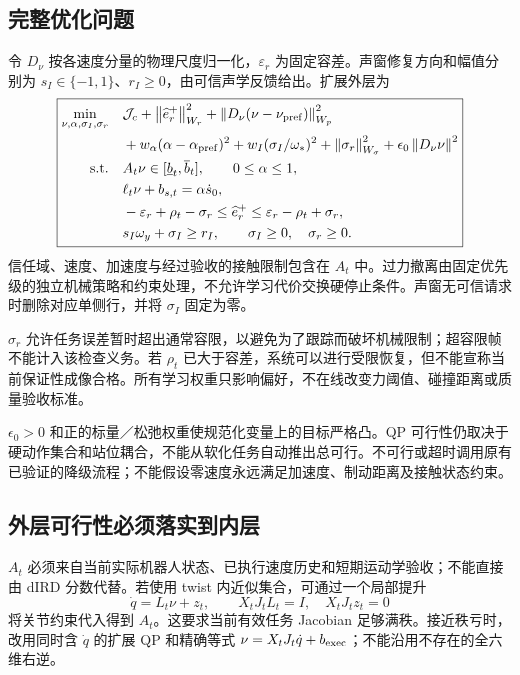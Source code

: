 \documentclass[UTF8,11pt,a4paper,fontset=fandol]{ctexart}
\numberwithin{equation}{section}
\theoremstyle{definition}
\newcommand{\norm}[1]{\left\lVert#1\right\rVert}
\begin{document}
\subsection{完整优化问题}
令 $D_\nu$ 按各速度分量的物理尺度归一化，$\varepsilon_r$ 为固定容差。声窗修复方向和幅值分别为 $s_I\in\{-1,1\}$、$r_I\ge0$，由可信声学反馈给出。扩展外层为
\begin{equation}
\boxed{
\begin{aligned}
\min_{\nu,\alpha,\sigma_I,\sigma_r}\quad &
\mathcal J_c
+\norm{\widehat e_r^+}_{W_r}^2
+\norm{D_\nu(\nu-\nu_{\rm pref})}_{W_p}^2\\
&+w_\alpha(\alpha-\alpha_{\rm pref})^2
+w_I(\sigma_I/\omega_*)^2+\norm{\sigma_r}_{W_\sigma}^2
+\epsilon_0\norm{D_\nu\nu}^2\\
\text{s.t.}\quad & A_t\nu\in[\underline b_t,\overline b_t],\qquad 0\le\alpha\le1,\\
&\ell_t\nu+b_{s,t}=\alpha\dot s_0,\\
&-\varepsilon_r+\rho_t-\sigma_r
\le\widehat e_r^+
\le\varepsilon_r-\rho_t+\sigma_r,\\
&s_I\omega_y+\sigma_I\ge r_I,\qquad
\sigma_I\ge0,\quad\sigma_r\ge0.
\end{aligned}}
\label{eq:fullqp}
\end{equation}
信任域、速度、加速度与经过验收的接触限制包含在 $A_t$ 中。过力撤离由固定优先级的独立机械策略和约束处理，不允许学习代价交换硬停止条件。声窗无可信请求时删除对应单侧行，并将 $\sigma_I$ 固定为零。

$\sigma_r$ 允许任务误差暂时超出通常容限，以避免为了跟踪而破坏机械限制；超容限帧不能计入该检查义务。若 $\rho_t$ 已大于容差，系统可以进行受限恢复，但不能宣称当前保证性成像合格。所有学习权重只影响偏好，不在线改变力阈值、碰撞距离或质量验收标准。

$\epsilon_0>0$ 和正的标量／松弛权重使规范化变量上的目标严格凸。QP 可行性仍取决于硬动作集合和站位耦合，不能从软化任务自动推出总可行。不可行或超时调用原有已验证的降级流程；不能假设零速度永远满足加速度、制动距离及接触状态约束。

\subsection{外层可行性必须落实到内层}
$A_t$ 必须来自当前实际机器人状态、已执行速度历史和短期运动学验收；不能直接由 dIRD 分数代替。若使用 twist 内近似集合，可通过一个局部提升
\begin{equation}
\dot q=L_t\nu+z_t,\qquad
X_tJ_tL_t=I,\quad X_tJ_tz_t=0
\label{eq:lift}
\end{equation}
将关节约束代入得到 $A_t$。这要求当前有效任务 Jacobian 足够满秩。接近秩亏时，改用同时含 $\dot q$ 的扩展 QP 和精确等式 $\nu=X_tJ_t\dot q+b_{\rm exec}$；不能沿用不存在的全六维右逆。
\end{document}
